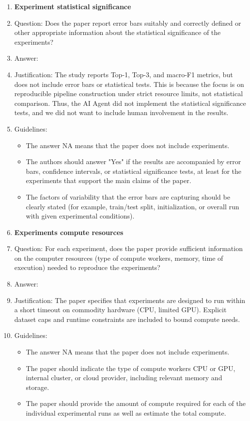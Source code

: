 \documentclass{article}
\theoremstyle{plain}
\theoremstyle{definition}
\theoremstyle{remark}
\begin{document}
\begin{enumerate}
		\item {\bf Experiment statistical significance}
		\item[] Question: Does the paper report error bars suitably and correctly defined or other appropriate information about the statistical significance of the experiments?
		\item[] Answer: \answerNo{}
		\item[] Justification: The study reports Top-1, Top-3, and macro-F1 metrics, but does not include error bars or statistical tests. This is because the focus is on reproducible pipeline construction under strict resource limits, not statistical comparison. Thus, the AI Agent did not implement the statistical significance tests, and we did not want to include human involvement in the results.
		\item[] Guidelines:
		\begin{itemize}
			\item The answer NA means that the paper does not include experiments.
			\item The authors should answer "Yes" if the results are accompanied by error bars, confidence intervals, or statistical significance tests, at least for the experiments that support the main claims of the paper.
			\item The factors of variability that the error bars are capturing should be clearly stated (for example, train/test split, initialization, or overall run with given experimental conditions).
		\end{itemize}
		
		\item {\bf Experiments compute resources}
		\item[] Question: For each experiment, does the paper provide sufficient information on the computer resources (type of compute workers, memory, time of execution) needed to reproduce the experiments?
		\item[] Answer: \answerYes{}
		\item[] Justification: The paper specifies that experiments are designed to run within a short timeout on commodity hardware (CPU, limited GPU). Explicit dataset caps and runtime constraints are included to bound compute needs.
		\item[] Guidelines:
		\begin{itemize}
			\item The answer NA means that the paper does not include experiments.
			\item The paper should indicate the type of compute workers CPU or GPU, internal cluster, or cloud provider, including relevant memory and storage.
			\item The paper should provide the amount of compute required for each of the individual experimental runs as well as estimate the total compute. 
		\end{itemize}
		

\end{enumerate}
\end{document}
